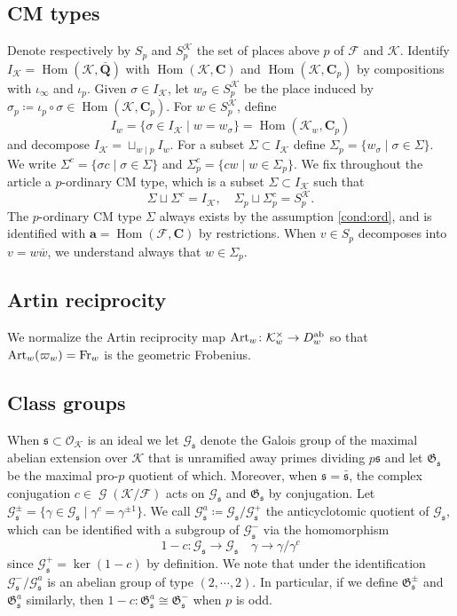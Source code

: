 \documentclass[leqno]{amsart}
\theoremstyle{definition}
\theoremstyle{remark}
\newcommand{\oo}{\mathcal{O}}
\newcommand{\Q}{{\mathbf{Q}}}
\newcommand{\C}{\mathbf C}
\newcommand{\arch}{\mathbf{a}}
\DeclareMathOperator{\Hom}{Hom}
\DeclareMathOperator{\Gal}{\mathcal{G}}
\DeclareMathOperator{\Art}{Art}
\newcommand{\Fr}{\textnormal{Fr}} %
\newcommand{\fs}{\mathfrak{s}}
\newcommand{\F}{{\mathcal{F}}} %
\newcommand{\K}{{\mathcal{K}}} %
\newcommand{\bw}{\overline{w}}
\newcommand{\cG}{\mathcal{G}}
\newcommand{\fG}{\mathfrak{G}}
\begin{document}
\subsection{CM types}

Denote respectively by $S_p$ and $S_p^\K$ the set of places above $p$
of $\F$ and $\K$.
Identify $I_\K=\Hom(\K,\bar{\Q})$ with
$\Hom(\K,\C)$ and $\Hom(\K,\C_p)$ by compositions with $\iota_\infty$ and $\iota_p$.
Given $\sigma\in I_\K$,
let $w_\sigma\in S_p^\K$ be the place induced by
$\sigma_p\coloneqq \iota_p\circ \sigma\in\Hom(\K,\C_p)$.
For $w\in S_p^\K$, define
\[
    I_w=\{\sigma\in I_\K\mid w=w_\sigma \}=\Hom(\K_w,\C_p)
\]
and decompose $I_\K=\sqcup_{w\mid p}I_w$.
For a subset $\Sigma\subset I_\K$
define $\Sigma_p=\{w_\sigma\mid \sigma\in \Sigma\}$.
We write
$\Sigma^c=\{\sigma c\mid \sigma\in \Sigma\}$ and 
$\Sigma_p^c=\{cw\mid w\in \Sigma_p\}$.
We fix throughout the article a $p$-ordinary CM type,
which is a subset $\Sigma\subset I_\K$ such that
\[
    \Sigma\sqcup \Sigma^c=I_\K,\quad
    \Sigma_p\sqcup \Sigma_p^c=S_p^\K.
\]
The $p$-ordinary CM type $\Sigma$
always exists by the assumption \eqref{cond:ord},
and is identified with $\arch=\Hom(\F,\C)$ by restrictions.
When $v\in S_p$ decomposes into $v=w\bw$,
we understand always that $w\in \Sigma_p$.

\subsection{Artin reciprocity}
We normalize the Artin reciprocity map
$\Art_w\colon \K_w^\times \to D_w^{\textnormal{ab}}$
so that $\Art_w(\varpi_w)=\Fr_w$
is the geometric Frobenius.

\subsection{Class groups}

When $\fs\subset\oo_\K$ is an ideal
we let $\cG_{\fs}$ denote the Galois group
of the maximal abelian extension over $\K$
that is unramified away primes dividing $p\fs$
and let $\fG_{\fs}$ be the maximal pro-$p$ quotient of which.
Moreover, when $\fs=\bar{\fs}$,
the complex conjugation $c\in \Gal(\K/\F)$
acts on $\cG_{\fs}$ and $\fG_{\fs}$ by conjugation.
Let $\cG_{\fs}^\pm=\{\gamma\in \cG_{\fs}\mid \gamma^c=\gamma^{\pm1}\}$.
We call $\cG_{\fs}^a\coloneqq \cG_{\fs}/\cG_{\fs}^+$
the anticyclotomic quotient of $\cG_{\fs}$, which can be 
identified with a subgroup of $\cG_{\fs}^-$ via the homomorphism
\[
    1-c\colon \cG_{\fs}\to \cG_{\fs}\quad \gamma\to \gamma/\gamma^c
\]
since $\cG_{\fs}^+=\ker(1-c)$ by definition.
We note that under the identification
$\cG_{\fs}^-/\cG_{\fs}^a$ is an abelian group of type $(2,\cdots,2)$.
In particular, 
if we define $\fG_{\fs}^{\pm}$ and $\fG_{\fs}^a$ similarly,
then $1-c\colon \fG_{\fs}^a\cong \fG_{\fs}^-$
when $p$ is odd.
\end{document}
